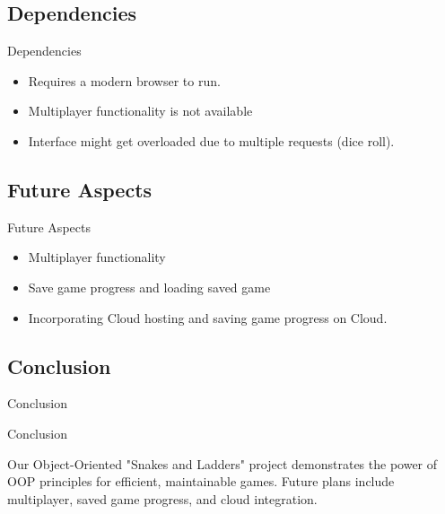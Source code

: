 \documentclass{beamer}
\begin{document}
\subsection{Dependencies}
\begin{frame}{Dependencies}
    \begin{itemize}
        \item Requires a modern browser to run.
        \item Multiplayer functionality is not available
        \item Interface might get overloaded due to multiple requests (dice roll).
    \end{itemize}
\end{frame}
\subsection{Future Aspects}
\begin{frame}{Future Aspects}
    \begin{itemize}
        \item Multiplayer functionality
        \item Save game progress and loading saved game
        \item Incorporating Cloud hosting and saving game progress on Cloud.
    \end{itemize}
\end{frame}
\subsection{Conclusion}
\begin{frame}{Conclusion}
\begin{block}{Conclusion}
    
Our Object-Oriented "Snakes and Ladders" project demonstrates the power of OOP principles for efficient, maintainable games. Future plans include multiplayer, saved game progress, and cloud integration.
\end{block}

\end{frame}
\end{document}
